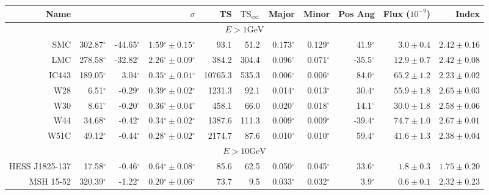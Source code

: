 \documentclass[preprint]{aastex}
\newcommand{\gev}{\text{GeV}\xspace}
\newcommand{\tsext}{{\ensuremath{\text{TS}_\text{ext}}}\xspace}
\newcommand{\glon}{\text{GLON}\xspace}
\newcommand{\glat}{\text{GLAT}\xspace}
\renewcommand{\deg}{\ensuremath{^\circ}\xspace}
\begin{document}
\clearpage
\begin{table}
    \begin{centering}
      \begin{tabular}{r|rrrrrrrrrr}
        \hline
        \hline
        Name                 &          \glon &          \glat &                    $\sigma$ &       TS &   $\tsext$ &      Major &      Minor &    Pos Ang &      Flux ($10^{-9}$) &                 Index \\
        \hline
        \multicolumn{11}{c}{$E > 1\gev$} \\
        \hline
        SMC                  &     302.87\deg &     -44.65\deg & $  1.59\deg \pm   0.15\deg$ &     93.1 &       51.2 &  0.173\deg &  0.129\deg &   41.9\deg & $    3.0 \pm     0.4$ & $   2.42 \pm    0.16$ \\
        LMC                  &     278.58\deg &     -32.82\deg & $  2.26\deg \pm   0.09\deg$ &    384.2 &      304.4 &  0.096\deg &  0.071\deg &  -35.5\deg & $   12.9 \pm     0.7$ & $   2.42 \pm    0.08$ \\
        IC443                &     189.05\deg &       3.04\deg & $  0.35\deg \pm   0.01\deg$ &  10765.3 &      535.3 &  0.006\deg &  0.006\deg &   84.0\deg & $   65.2 \pm     1.2$ & $   2.23 \pm    0.02$ \\
        W28                  &       6.51\deg &      -0.29\deg & $  0.39\deg \pm   0.02\deg$ &   1231.3 &       92.1 &  0.014\deg &  0.013\deg &   30.4\deg & $   55.9 \pm     1.8$ & $   2.65 \pm    0.03$ \\
        W30                  &       8.61\deg &      -0.20\deg & $  0.36\deg \pm   0.04\deg$ &    458.1 &       66.0 &  0.020\deg &  0.018\deg &   14.1\deg & $   30.0 \pm     1.8$ & $   2.58 \pm    0.06$ \\
        W44                  &      34.68\deg &      -0.42\deg & $  0.34\deg \pm   0.02\deg$ &   1387.6 &      111.3 &  0.009\deg &  0.009\deg &  -39.4\deg & $   74.7 \pm     1.0$ & $   2.67 \pm    0.01$ \\
        W51C                 &      49.12\deg &      -0.44\deg & $  0.28\deg \pm   0.02\deg$ &   2174.7 &       87.6 &  0.010\deg &  0.010\deg &   59.4\deg & $   41.6 \pm     1.3$ & $   2.38 \pm    0.04$ \\
        \hline
        \multicolumn{11}{c}{$E > 10\gev$} \\
        \hline
        HESS J1825-137       &      17.58\deg &      -0.46\deg & $  0.64\deg \pm   0.08\deg$ &     85.6 &       62.5 &  0.050\deg &  0.045\deg &   33.6\deg & $    1.8 \pm     0.3$ & $   1.75 \pm    0.20$ \\
        MSH 15-52            &     320.39\deg &      -1.22\deg & $  0.20\deg \pm   0.06\deg$ &     73.7 &        9.5 &  0.033\deg &  0.032\deg &    3.9\deg & $    0.6 \pm     0.1$ & $   2.32 \pm    0.23$ \\


\end{tabular}
\end{centering}
\end{table}
\end{document}
